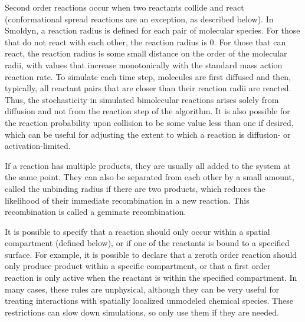 \documentclass {book}
\begin{document}
Second order reactions occur when two reactants collide and react (conformational spread reactions are an exception, as described below). In Smoldyn, a reaction radius is defined for each pair of molecular species. For those that do not react with each other, the reaction radius is 0. For those that can react, the reaction radius is some small distance on the order of the molecular radii, with values that increase monotonically with the standard mass action reaction rate. To simulate each time step, molecules are first diffused and then, typically, all reactant pairs that are closer than their reaction radii are reacted. Thus, the stochasticity in simulated bimolecular reactions arises solely from diffusion and not from the reaction step of the algorithm. It is also possible for the reaction probability upon collision to be some value less than one if desired, which can be useful for adjusting the extent to which a reaction is diffusion- or activation-limited.

If a reaction has multiple products, they are usually all added to the system at the same point. They can also be separated from each other by a small amount, called the unbinding radius if there are two products, which reduces the likelihood of their immediate recombination in a new reaction. This recombination is called a geminate recombination.

It is possible to specify that a reaction should only occur within a spatial compartment (defined below), or if one of the reactants is bound to a specified surface. For example, it is possible to declare that a zeroth order reaction should only produce product within a specific compartment, or that a first order reaction is only active when the reactant is within the specified compartment. In many cases, these rules are unphysical, although they can be very useful for treating interactions with spatially localized unmodeled chemical species. These restrictions can slow down simulations, so only use them if they are needed.
\end{document}
